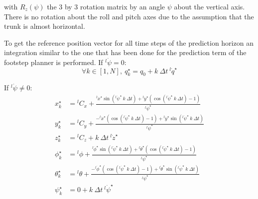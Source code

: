 \documentclass[a4paper,11pt]{article}
\begin{document}
with $R_z(\psi)$ the 3 by 3 rotation matrix by an angle $\psi$ about the vertical axis. There is no rotation about the roll and pitch axes due to the assumption that the trunk is almost horizontal.


To get the reference position vector for all time steps of the prediction horizon an integration similar to the one that has been done for the prediction term of the footstep planner is performed. If ${}^l\!\dot \psi = 0$:
\begin{equation}
\forall k \in [1, N], ~ q_{k}^\star = q_0 + k ~ \Delta t ~  {}^l\! \dot q^\star
\end{equation}

If ${}^l\!\dot \psi \neq 0$:
\begin{align}
x_k^\star &= {}^l\! C_x + \frac{{}^l\!\dot x^\star \sin({}^l\!\dot \psi^\star ~ k ~ \Delta t) + {}^l\!\dot y^\star \left( \cos({}^l\!\dot \psi^\star ~ k ~ \Delta t) - 1 \right)}{{}^l\!\dot \psi^\star} \\
y_k^\star &= {}^l\! C_y + \frac{- {}^l\!\dot x^\star \left( \cos({}^l\!\dot \psi^\star ~ k ~ \Delta t) - 1 \right) + {}^l\!\dot y^\star \sin({}^l\!\dot \psi^\star ~ k ~ \Delta t)}{{}^l\!\dot \psi^\star} \\
z_k^\star &= {}^l\! C_z + k ~ \Delta t ~  {}^l\! \dot z^\star \\
\phi_k^\star &= {}^l\! \phi + \frac{{}^l\!\dot \phi^\star \sin({}^l\!\dot \psi^\star ~ k ~ \Delta t) + {}^l\!\dot \theta^\star \left( \cos({}^l\!\dot \psi^\star ~ k ~ \Delta t) - 1 \right)}{{}^l\!\dot \psi^\star} \\
\theta_k^\star &= {}^l\! \theta + \frac{- {}^l\!\dot \phi^\star \left( \cos({}^l\!\dot \psi^\star ~ k ~ \Delta t) - 1 \right) + {}^l\!\dot \theta^\star \sin({}^l\!\dot \psi^\star ~ k ~ \Delta t)}{{}^l\!\dot \psi^\star} \\
\psi_k^\star &= 0 + k ~ \Delta t ~  {}^l\! \dot \psi^\star \\
\end{align}
\end{document}
